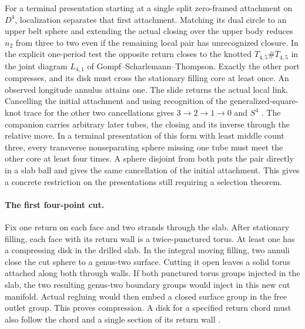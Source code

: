 \documentclass[11pt,letterpaper]{article}
\numberwithin{equation}{section}
\begin{document}
For a terminal presentation starting at a single split zero-framed
attachment on \(D^4\), localization separates that first attachment.
Matching its dual circle to an upper belt sphere and extending the
actual closing over the upper body reduces \(n_2\) from three to
two even if the remaining local pair has unrecognized closure.
In the explicit one-period test the opposite return closes to the
knotted \(T_{4,5}\#\overline{T}_{4,5}\) in the joint diagram
\(L_{4,1}\) of Gompf--Scharlemann--Thompson. Exactly the other
port compresses, and its disk must cross the stationary filling
core at least once. An observed longitude annulus attains one.
The slide returns the actual local link. Cancelling the initial
attachment and using recognition of the generalized-square-knot
trace for the other two cancellations gives \(3\to2\to1\to0\) and
\(S^4\) \cite{GompfScharlemannThompson2010,MeierZupan2022SquareKnots,Baker2026HandleCuts}.
The companion carries arbitrary later tubes, the closing and its
inverse through the relative move. In a terminal presentation of this form with least middle count
three, every transverse nonseparating sphere missing one tube must
meet the other core at least four times. A sphere disjoint from both
puts the pair directly in a slab ball and gives the same cancellation
of the initial attachment. This gives a concrete restriction on the
presentations still requiring a selection theorem.

\paragraph{The first four-point cut.}
Fix one return on each face and two strands through the slab.
After stationary filling, each face with its return wall is a
twice-punctured torus. At least one has a compressing disk in the
drilled slab. In the integral moving filling, two annuli close
the cut sphere to a genus-two surface. Cutting it open leaves a
solid torus attached along both through walls. If both punctured
torus groups injected in the slab, the two resulting genus-two
boundary groups would inject in this new cut manifold. Actual
regluing would then embed a closed surface group in the free
outlet group. This proves compression. A disk for a specified
return chord must also follow the chord and a single section of
its return wall \cite{Baker2026HandleCuts}.
\end{document}
